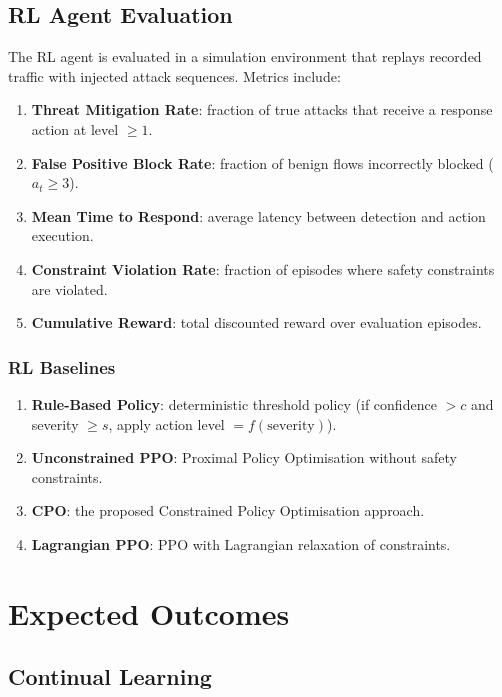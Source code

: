 \documentclass[12pt,a4paper]{article}
\theoremstyle{definition}
\begin{document}
\subsection{RL Agent Evaluation}

The RL agent is evaluated in a simulation environment that replays recorded traffic with injected attack sequences.
Metrics include:

\begin{enumerate}
\item \textbf{Threat Mitigation Rate}: fraction of true attacks that receive a response action at level $\geq 1$.
\item \textbf{False Positive Block Rate}: fraction of benign flows incorrectly blocked ($a_t \geq 3$).
\item \textbf{Mean Time to Respond}: average latency between detection and action execution.
\item \textbf{Constraint Violation Rate}: fraction of episodes where safety constraints are violated.
\item \textbf{Cumulative Reward}: total discounted reward over evaluation episodes.
\end{enumerate}

\subsubsection{RL Baselines}

\begin{enumerate}
\item \textbf{Rule-Based Policy}: deterministic threshold policy (if confidence $> c$ and severity $\geq s$, apply action level $= f(\text{severity})$).
\item \textbf{Unconstrained PPO}: Proximal Policy Optimisation without safety constraints.
\item \textbf{CPO}: the proposed Constrained Policy Optimisation approach.
\item \textbf{Lagrangian PPO}: PPO with Lagrangian relaxation of constraints.
\end{enumerate}


\section{Expected Outcomes}
\label{sec:expected}

\subsection{Continual Learning}
\end{document}
